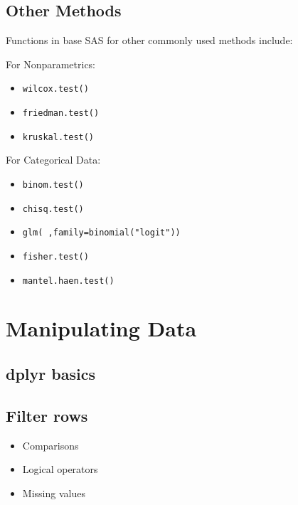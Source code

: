 \documentclass[
]{book}
\providecommand{\tightlist}{%
  \setlength{\itemsep}{0pt}\setlength{\parskip}{0pt}}
\begin{document}
\hypertarget{other-methods}{%
\section{Other Methods}\label{other-methods}}

Functions in base SAS for other commonly used methods include:

For Nonparametrics:

\begin{itemize}
\tightlist
\item
  \texttt{wilcox.test()}
\item
  \texttt{friedman.test()}
\item
  \texttt{kruskal.test()}
\end{itemize}

For Categorical Data:

\begin{itemize}
\tightlist
\item
  \texttt{binom.test()}
\item
  \texttt{chisq.test()}
\item
  \texttt{glm(\ ,family=binomial("logit"))}
\item
  \texttt{fisher.test()}
\item
  \texttt{mantel.haen.test()}
\end{itemize}

\hypertarget{manipulating-data}{%
\chapter{Manipulating Data}\label{manipulating-data}}

\hypertarget{dplyr-basics}{%
\section*{dplyr basics}\label{dplyr-basics}}

\hypertarget{filter-rows}{%
\section{Filter rows}\label{filter-rows}}

\begin{itemize}
\tightlist
\item
  Comparisons
\item
  Logical operators
\item
  Missing values
\end{itemize}
\end{document}
